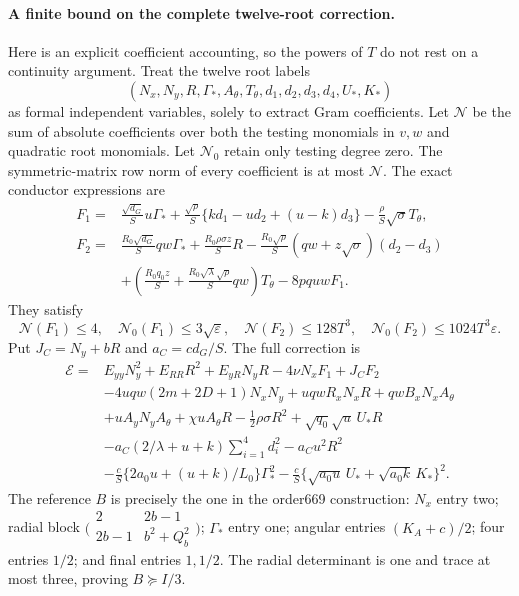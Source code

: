 \documentclass[11pt]{article}
\newcommand{\eps}{\varepsilon}
\newcommand{\sigs}{\sigma}
\begin{document}
\paragraph{A finite bound on the complete twelve-root correction.}
Here is an explicit coefficient accounting, so the powers of $T$ do
not rest on a continuity argument. Treat the twelve root labels
\[
 (N_x,N_y,R,\Gamma_*,A_\theta,T_\theta,d_1,d_2,d_3,d_4,U_*,K_*)
\]
as formal independent variables, solely to extract Gram coefficients.
Let $\mathcal N$ be the sum of absolute coefficients over both the
testing monomials in $v,w$ and quadratic root monomials. Let
$\mathcal N_0$ retain only testing degree zero. The symmetric-matrix
row norm of every coefficient is at most $\mathcal N$.
The exact conductor expressions are
\begin{align*}
 F_1={}&\frac{\sqrt{d_G}}S u\Gamma_*
 +\frac{\sqrt\rho}S\{k d_1-u d_2+(u-k)d_3\}
 -\frac\rho S\sqrt\sigs T_\theta,\\
 F_2={}&\frac{R_0\sqrt{d_G}}S qw\Gamma_*
 +\frac{R_0\rho\sigs z}S R
 -\frac{R_0\sqrt\rho}S(qw+z\sqrt\sigs)(d_2-d_3)\\
 &+\left(\frac{R_0q_0z}S+
                \frac{R_0\sqrt\lambda\sqrt\rho}S qw\right)T_\theta
 -8pquwF_1 .
\end{align*}
They satisfy
\[
 \mathcal N(F_1)\le4,\quad \mathcal N_0(F_1)\le3\sqrt\eps,
 \quad \mathcal N(F_2)\le128T^3,\quad
 \mathcal N_0(F_2)\le1024T^3\eps.
\]
Put $J_C=N_y+bR$ and $a_C=cd_G/S$. The full correction is
\begin{align*}
 \mathcal E={}&E_{yy}N_y^2+E_{RR}R^2+E_{yR}N_yR
 -4\nu N_xF_1+J_CF_2\\
 &-4uqw(2m+2D+1)N_xN_y+uqwR_xN_xR+qwB_xN_xA_\theta\\
 &+uA_yN_yA_\theta+\chi uA_\theta R
 -\tfrac12\rho\sigs R^2+\sqrt{q_0}\sqrt u\,U_*R\\
 &-a_C(2/\lambda+u+k)\sum_{i=1}^4d_i^2-a_Cu^2R^2\\
 &-\frac cS\{2a_0u+(u+k)/L_0\}\Gamma_*^2
 -\frac cS\{\sqrt{a_0u}\,U_*+\sqrt{a_0k}\,K_*\}^2.
\end{align*}
The reference $B$ is precisely the one in the order669 construction:
$N_x$ entry two; radial block
$\bigl(\begin{smallmatrix}2&2b-1\\2b-1&b^2+Q_b^2\end{smallmatrix}\bigr)$;
$\Gamma_*$ entry one; angular entries $(K_A+c)/2$; four entries $1/2$;
and final entries $1,1/2$. The radial determinant is one and trace at
most three, proving $B\succeq I/3$.
\end{document}
